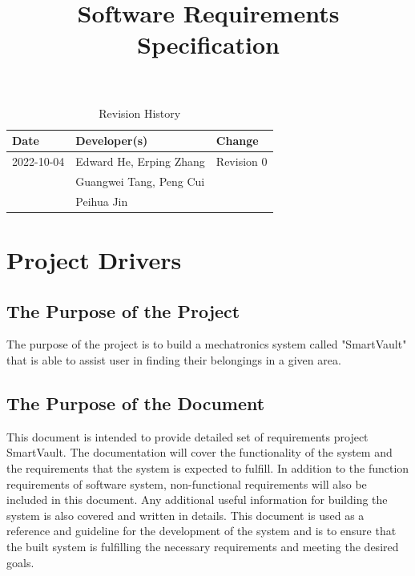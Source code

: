 \documentclass[12pt]{article}
\title{Software Requirements Specification\\\progname}
\author{\authname}
\date{}
\begin{document}
\maketitle

\newpage
{}

\tableofcontents

\newpage

\begin{table}[hp]
\caption{Revision History} \label{TblRevisionHistory}
\begin{tabularx}{\textwidth}{llX}
\toprule
\textbf{Date} & \textbf{Developer(s)} & \textbf{Change}\\
\midrule
2022-10-04 & Edward He, Erping Zhang & Revision 0\\
& Guangwei Tang, Peng Cui & \\
& Peihua Jin & \\
\bottomrule
\end{tabularx}
\end{table}

\newpage

\listoftables
\listoffigures

\newpage




\begin{table}

\end{table}

\section{Project Drivers}

\subsection{The Purpose of the Project}
The purpose of the project is to build a mechatronics system called "SmartVault" that is able to assist user in finding their belongings in a given area. 
\subsection{The Purpose of the Document}
This document is intended to provide detailed set of requirements project SmartVault. The documentation will cover the functionality of the system and the requirements that the system is expected to fulfill. In addition to the function requirements of software system, non-functional requirements will also be included in this document. Any additional useful information for building the system is also covered and written in details. This document is used as a reference and guideline for the development of the system and is to ensure that the built system is fulfilling the necessary requirements and meeting the desired goals.
\end{document}

